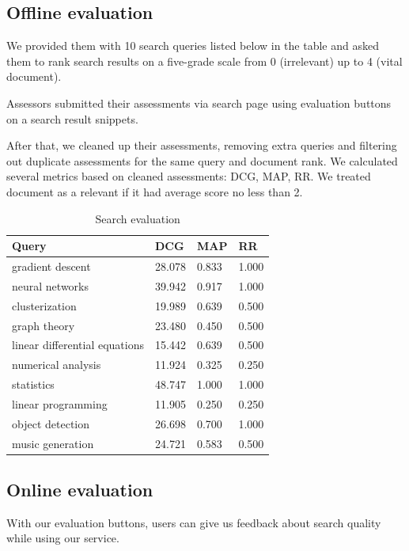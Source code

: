 \subsection{Offline evaluation}
We provided them with 10 search queries listed below in the table and asked them to rank search results on a five-grade scale from 0 (irrelevant) up to 4 (vital document).

Assessors submitted their assessments via search page using evaluation buttons on a search result snippets.

After that, we cleaned up their assessments, removing extra queries and filtering out duplicate assessments for the same query and document rank.
We calculated several metrics based on cleaned assessments: DCG, MAP, RR. We treated document as a relevant if it had average score no less than 2.

\begin{table}
    \centering 
    \begin{tabular}{| l | l | l | l |}
        \toprule
        Query & DCG & MAP & RR \\ 
        \midrule
        gradient descent & 28.078 & 0.833 & 1.000 \\  
        neural networks & 39.942 & 0.917 & 1.000 \\  
        clusterization & 19.989 & 0.639 & 0.500 \\  
        graph theory & 23.480 & 0.450 & 0.500 \\  
        linear differential equations & 15.442 & 0.639 & 0.500 \\  
        numerical analysis & 11.924 & 0.325 & 0.250 \\  
        statistics & 48.747 & 1.000 & 1.000 \\  
        linear programming & 11.905 & 0.250 & 0.250 \\  
        object detection & 26.698 & 0.700 & 1.000 \\  
        music generation & 24.721 & 0.583 & 0.500 \\  
        \bottomrule
    \end{tabular}
    \caption{Search evaluation}
\end{table}

\subsection{Online evaluation}
With our evaluation buttons, users can give us feedback about search quality while using our service.

